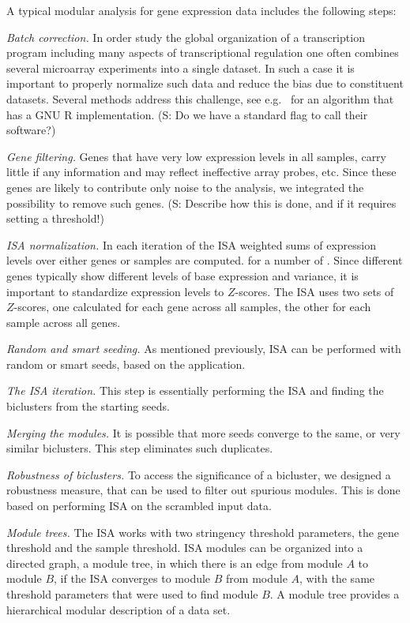 \documentclass{bioinfo}
\begin{document}
A typical modular analysis for gene expression data includes the following
steps:

\emph{Batch correction.}
In order study the global organization of a transcription program including
many aspects of transcriptional regulation one often combines several
microarray experiments into a single dataset. In such a case it is important
to properly normalize such data and reduce the bias due to constituent
datasets. Several methods address this challenge,
see e.g.~\cite{johnson07} for an algorithm that has a GNU R implementation.
(S: Do we have a standard flag to call their software?)

\emph{Gene filtering.}
Genes that have very low expression levels in all samples, carry little if
any information and may reflect ineffective array probes, etc. Since these
genes are likely to contribute only noise to the analysis, we integrated the
possibility to remove such genes. (S: Describe how this is done, and if it
requires setting a threshold!) 

\emph{ISA normalization.}
In each iteration of the ISA weighted sums of expression levels over either
genes or samples are computed.  for a number of . Since different genes
typically show different levels of base
expression and variance, it is important to standardize expression
levels to $Z$-scores. The ISA uses two sets of $Z$-scores, one
calculated for each gene across all samples, the other for each sample
across all genes.

\emph{Random and smart seeding.}
As mentioned previously, ISA can be performed with random or smart
seeds, based on the application.

\emph{The ISA iteration.}
This step is essentially performing the ISA and finding the biclusters
from the starting seeds.

\emph{Merging the modules.}
It is possible that more seeds converge to the same, or very similar
biclusters. This step eliminates such duplicates.

\emph{Robustness of biclusters.}
To access the significance of a bicluster, we designed a robustness
measure, that can be used to filter out spurious modules. This is done
based on performing ISA on the scrambled input data.

\emph{Module trees.}
The ISA works with two stringency threshold parameters, the gene
threshold and the sample threshold. ISA modules can be organized into
a directed graph, a module tree, in which there is an edge from module
$A$ to module $B$, if the ISA converges to module $B$ from module $A$,
with the same threshold parameters  that were used to find module
$B$. A module tree provides a hierarchical modular description of a
data set.
\end{document}
